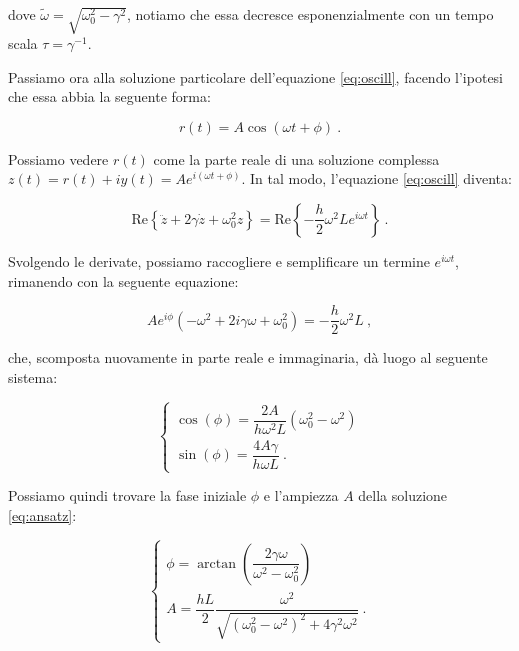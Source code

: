\documentclass[a4paper,10pt]{article}
\begin{document}
dove $\tilde \omega = \sqrt{\omega_0^2 - \gamma^2}$, notiamo che essa decresce esponenzialmente con un tempo scala $\tau = \gamma^{-1}$.

Passiamo ora alla soluzione particolare dell'equazione \eqref{eq:oscill}, facendo l'ipotesi che essa abbia la seguente forma:

\begin{equation} \label{eq:ansatz}
    r(t) = A \cos(\omega t + \phi) \ .
\end{equation}

Possiamo vedere $r(t)$ come la parte reale di una soluzione complessa $z(t) = r(t) + iy(t) = A e^{i(\omega t + \phi)}$. In tal modo, l'equazione \eqref{eq:oscill} diventa:

\begin{equation} \label{eq:complessa}
    \text{Re} \left\{ \ddot z + 2 \gamma \dot z + \omega_0^2 z \right\} = \text{Re} \left\{ - \frac{h}{2} \omega^2 L e^{i \omega t} \right\} \ .
\end{equation}

Svolgendo le derivate, possiamo raccogliere e semplificare un termine $e^{i \omega t}$, rimanendo con la seguente equazione:

\begin{equation}
    A e^{i \phi} (- \omega^2 + 2i \gamma \omega + \omega_0^2) = - \frac{h}{2} \omega^2 L \ ,
\end{equation}

che, scomposta nuovamente in parte reale e immaginaria, dà luogo al seguente sistema:

\begin{equation} \label{eq:sistemaphi}
\begin{cases}
    \cos(\phi) = \dfrac{2A}{h \omega^2 L} (\omega_0^2 - \omega^2) \\[2mm]
    \sin(\phi) = \dfrac{4A \gamma}{h \omega L} \ .
\end{cases}
\end{equation}

Possiamo quindi trovare la fase iniziale $\phi$ e l'ampiezza $A$ della soluzione \eqref{eq:ansatz}:

\begin{equation}
\begin{cases}
    \phi = \arctan \left( \dfrac{2 \gamma \omega}{\omega^2 - \omega_0^2} \right) \\[3mm]
    A = \dfrac{hL}{2} \dfrac{\omega^2}{\sqrt{(\omega_0^2 - \omega^2)^2 + 4 \gamma^2 \omega^2}} \ .
\end{cases}
\end{equation}
\end{document}
